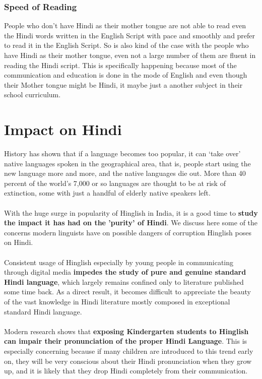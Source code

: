 \documentclass{article}
\begin{document}
\subsubsection{Speed of Reading}
People who don't have Hindi as their mother tongue are not able to read even the Hindi words written in the English Script with pace and smoothly and prefer to read it in the English Script. So is also kind of the case with the people who have Hindi as their mother tongue, even not a large number of them are fluent in reading the Hindi script. This is specifically happening because most of the communication and education is done in the mode of English and even though their Mother tongue might be Hindi, it maybe just a another subject in their school curriculum.

\section{Impact on Hindi}
History has shown that if a language becomes too popular, it can `take over' native languages spoken in the geographical area, that is, people start using the new language more and more, and the native languages die out. More than 40 percent of the world’s 7,000 or so languages are thought to be at risk of extinction, some with just a handful of elderly native speakers left.
\\\\
With the huge surge in popularity of Hinglish in India, it is a good time to \textbf{study the impact it has had on the 'purity' of Hindi}. We discuss here some of the concerns modern linguists have on possible dangers of corruption Hinglish poses on Hindi.
\\\\
Consistent usage of Hinglish especially by young people in communicating through digital media \textbf{impedes the study of pure and genuine standard Hindi language}, which largely remains confined only to literature published some time back. As a direct result, it becomes difficult to appreciate the beauty of the vast knowledge in Hindi literature mostly composed in exceptional standard Hindi language.
\\\\
Modern research shows that \textbf{exposing Kindergarten students to Hinglish can impair their pronunciation of the proper Hindi Language}. This is especially concerning because if many children are introduced to this trend early on, they will be very conscious about their Hindi pronunciation when they grow up, and it is likely that they drop Hindi completely from their communication.
\end{document}
